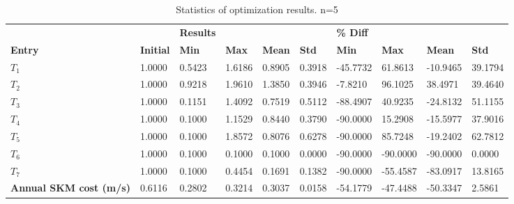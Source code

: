 \begin{table}[H]
\centering
\begin{tabular}{llllllllll}
\textbf{} & \textbf{} & \cellcolor[HTML]{EFEFEF}\textbf{Results} & \cellcolor[HTML]{EFEFEF} & \cellcolor[HTML]{EFEFEF} & \cellcolor[HTML]{EFEFEF} & \cellcolor[HTML]{EFEFEF}\textbf{\% Diff} & \cellcolor[HTML]{EFEFEF} & \cellcolor[HTML]{EFEFEF} & \cellcolor[HTML]{EFEFEF} \\
\rowcolor[HTML]{EFEFEF} 
\textbf{Entry} & \textbf{Initial} & \textbf{Min} & \textbf{Max} & \textbf{Mean} & \textbf{Std} & \textbf{Min} & \textbf{Max} & \textbf{Mean} & \textbf{Std} \\
$T_{1}$ & 1.0000 & 0.5423 & 1.6186 & 0.8905 & 0.3918 & -45.7732 & 61.8613 & -10.9465 & 39.1794 \\ 
$T_{2}$ & 1.0000 & 0.9218 & 1.9610 & 1.3850 & 0.3946 & -7.8210 & 96.1025 & 38.4971 & 39.4640 \\ 
$T_{3}$ & 1.0000 & 0.1151 & 1.4092 & 0.7519 & 0.5112 & -88.4907 & 40.9235 & -24.8132 & 51.1155 \\ 
$T_{4}$ & 1.0000 & 0.1000 & 1.1529 & 0.8440 & 0.3790 & -90.0000 & 15.2908 & -15.5977 & 37.9016 \\ 
$T_{5}$ & 1.0000 & 0.1000 & 1.8572 & 0.8076 & 0.6278 & -90.0000 & 85.7248 & -19.2402 & 62.7812 \\ 
$T_{6}$ & 1.0000 & 0.1000 & 0.1000 & 0.1000 & 0.0000 & -90.0000 & -90.0000 & -90.0000 & 0.0000 \\ 
$T_{7}$ & 1.0000 & 0.1000 & 0.4454 & 0.1691 & 0.1382 & -90.0000 & -55.4587 & -83.0917 & 13.8165 \\ 
\rowcolor[HTML]{EFEFEF} 
\textbf{Annual SKM cost (m/s)} & 0.6116 & 0.2802 & 0.3214 & 0.3037 & 0.0158 & -54.1779 & -47.4488 & -50.3347 & 2.5861 \\ 
\end{tabular}
\caption{Statistics of optimization results. n=5}
\label{tab:StatisticsOptimizationAnalysis}
\end{table}